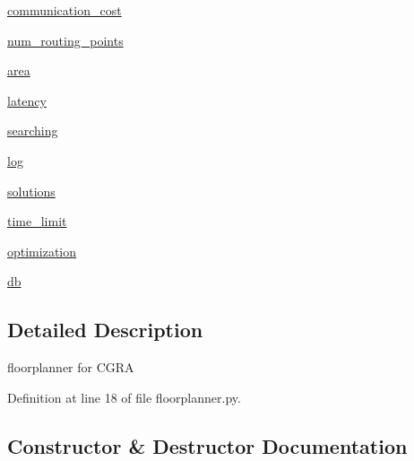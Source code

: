 \begin{DoxyCompactItemize}
\item 
\hyperlink{classsylva_1_1code__generation_1_1floorplanner_1_1floorplanner_ae89f7aced7d800c839f2b765ccef8e17}{communication\+\_\+cost}
\item 
\hyperlink{classsylva_1_1code__generation_1_1floorplanner_1_1floorplanner_acd90b8a28845457d7a02c7b64e7031b2}{num\+\_\+routing\+\_\+points}
\item 
\hyperlink{classsylva_1_1code__generation_1_1floorplanner_1_1floorplanner_a08dbae3d0806022bf436c82b3137ce55}{area}
\item 
\hyperlink{classsylva_1_1code__generation_1_1floorplanner_1_1floorplanner_ab2f40591a41eeaa9607f51b48c796b27}{latency}
\item 
\hyperlink{classsylva_1_1code__generation_1_1floorplanner_1_1floorplanner_a49fb578b9d1590ec05da989bf9b3393b}{searching}
\item 
\hyperlink{classsylva_1_1code__generation_1_1floorplanner_1_1floorplanner_a931da93a5d8a1efd65e401913fb722db}{log}
\item 
\hyperlink{classsylva_1_1code__generation_1_1floorplanner_1_1floorplanner_a4ecec4815a5e0fa5ba3f3ffb9f0697dc}{solutions}
\item 
\hyperlink{classsylva_1_1code__generation_1_1floorplanner_1_1floorplanner_aa6a27c1e810c6242a6876d943e108460}{time\+\_\+limit}
\item 
\hyperlink{classsylva_1_1code__generation_1_1floorplanner_1_1floorplanner_ae93626229396fc7e99339545e571ffff}{optimization}
\item 
\hyperlink{classsylva_1_1code__generation_1_1floorplanner_1_1floorplanner_a51d125ec34729ef82c7ab89ca2f9ee36}{db}
\end{DoxyCompactItemize}


\subsection{Detailed Description}
\begin{DoxyVerb}floorplanner for CGRA\end{DoxyVerb}
 

Definition at line 18 of file floorplanner.\+py.



\subsection{Constructor \& Destructor Documentation}
\mbox{\label{classsylva_1_1code__generation_1_1floorplanner_1_1floorplanner_abd8cead4c94d6202ff252a9e37615abe}} 
